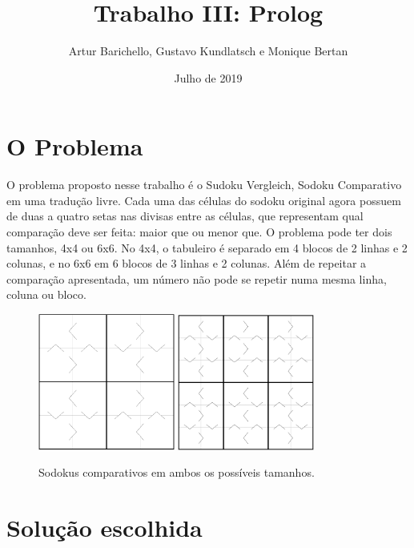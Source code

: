 \documentclass{article}
\title{Trabalho III: Prolog}
\author{Artur Barichello, Gustavo Kundlatsch e Monique Bertan}
\date{Julho de 2019}
\begin{document}
\maketitle

\section{O Problema}

O problema proposto nesse trabalho é o Sudoku Vergleich, Sodoku Comparativo em uma tradução livre. Cada uma das células do sodoku original agora possuem de duas a quatro setas nas divisas entre as células, que representam qual comparação deve ser feita: maior que ou menor que. O problema pode ter dois tamanhos, 4x4 ou 6x6. No 4x4, o tabuleiro é separado em 4 blocos de 2 linhas e 2 colunas, e no 6x6 em 6 blocos de 3 linhas e 2 colunas. Além de repeitar a comparação apresentada, um número não pode se repetir numa mesma linha, coluna ou bloco.

\begin{figure}[h!]
    \centering
    \includegraphics[width=0.4\textwidth]{cs1.jpg}
    \includegraphics[width=0.4\textwidth]{cs2.jpg}
    \caption{Sodokus comparativos em ambos os possíveis tamanhos.}
    \label{fig:puzzle}
\end{figure}

\newpage
\section{Solução escolhida}
\end{document}
